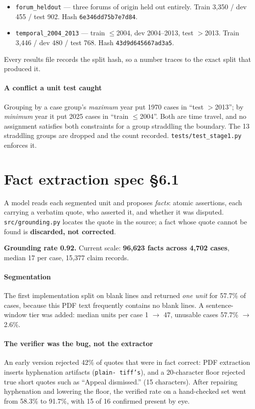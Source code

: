 \documentclass[12pt,a4paper]{article}
\newcommand{\code}[1]{\texttt{\small #1}}
\newcommand{\spec}[1]{\textbf{spec §#1}}
\begin{document}
\begin{itemize}
\item \code{forum\_heldout} --- three forums of origin held out entirely. Train 3,350 / dev 455 /
test 902. Hash \code{6e346dd75b7e7d84}.
\item \code{temporal\_2004\_2013} --- train $\leq$2004, dev 2004--2013, test $>$2013. Train 3,446 /
dev 480 / test 768. Hash \code{43d9d645667ad3a5}.
\end{itemize}

Every results file records the split hash, so a number traces to the exact split that produced it.

\paragraph{A conflict a unit test caught} Grouping by a case group's \emph{maximum} year put 1970
cases in ``test $>$2013''; by \emph{minimum} year it put 2025 cases in ``train $\leq$2004''. Both are
time travel, and no assignment satisfies both constraints for a group straddling the boundary. The
13 straddling groups are dropped and the count recorded. \code{tests/test\_stage1.py} enforces it.

\section{Fact extraction \spec{6.1}}\label{sec:extraction}

A model reads each segmented unit and proposes \emph{facts}: atomic assertions, each carrying a
verbatim quote, who asserted it, and whether it was disputed. \code{src/grounding.py} locates the
quote in the source; a fact whose quote cannot be found is \textbf{discarded, not corrected}.

\textbf{Grounding rate 0.92.} Current scale: \textbf{96,623 facts across 4,702 cases}, median 17 per
case, 15,377 claim records.

\paragraph{Segmentation} The first implementation split on blank lines and returned \emph{one unit}
for 57.7\% of cases, because this PDF text frequently contains no blank lines. A sentence-window
tier was added: median units per case 1 $\rightarrow$ 47, unusable cases 57.7\% $\rightarrow$ 2.6\%.

\paragraph{The verifier was the bug, not the extractor} An early version rejected 42\% of quotes
that were in fact correct: PDF extraction inserts hyphenation artifacts (\code{plain- tiff's}), and a
20-character floor rejected true short quotes such as ``Appeal dismissed.'' (15 characters). After
repairing hyphenation and lowering the floor, the verified rate on a hand-checked set went from
58.3\% to 91.7\%, with 15 of 16 confirmed present by eye.
\end{document}
